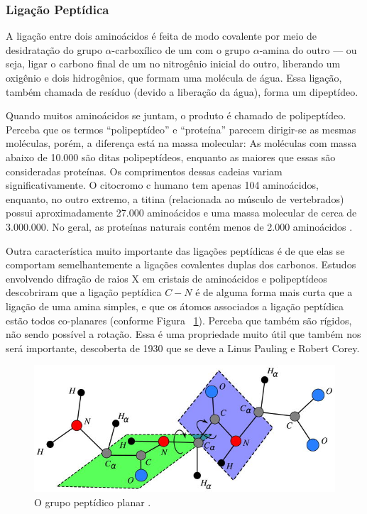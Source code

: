 \documentclass[a4paper,12pt]{article}
\begin{document}
	\subsubsection*{Ligação Peptídica}
	A ligação entre dois aminoácidos é feita de modo covalente por meio de desidratação do grupo $\alpha$-carboxílico de um com o grupo $\alpha$-amina do outro --- ou seja, ligar o carbono final de um no nitrogênio inicial do outro, liberando um oxigênio e dois hidrogênios, que formam uma molécula de água. Essa ligação, também chamada de resíduo (devido a liberação da água), forma um dipeptídeo. 
	
	Quando muitos aminoácidos se juntam, o produto é chamado de polipeptídeo. Perceba que os termos ``polipeptídeo'' e ``proteína'' parecem dirigir-se as mesmas moléculas, porém, a diferença está na massa molecular: As moléculas com massa abaixo de 10.000 são ditas polipeptídeos, enquanto as maiores que essas são consideradas proteínas. Os comprimentos dessas cadeias variam significativamente. O citocromo c humano tem apenas 104 aminoácidos, enquanto, no outro extremo, a titina (relacionada ao músculo de vertebrados) possui aproximadamente 27.000 aminoácidos e uma massa molecular de cerca de 3.000.000. No geral, as proteínas naturais contém menos de 2.000 aminoácidos \cite{bioquimicaLehninger}.
	
	Outra característica muito importante das ligações peptídicas é de que elas se comportam semelhantemente a ligações covalentes duplas dos carbonos. Estudos envolvendo difração de raios X em cristais de aminoácidos e polipeptídeos descobriram que a ligação peptídica $C-N$ é de alguma forma mais curta que a ligação de uma amina simples, e que os átomos associados a ligação peptídica estão todos co-planares (conforme Figura ~\ref{fig:peptidica}). Perceba que também são rígidos, não sendo possível a rotação. Essa é uma propriedade muito útil que também nos será importante, descoberta de 1930 que se deve a Linus Pauling e Robert Corey.
	
	\begin{figure}[H]
		\begin{center}
			\includegraphics[width=0.8\linewidth]{peptide.jpg}
		\end{center}
		\caption{O grupo peptídico planar \cite{carlile:MinimalOrder}.}
		\label{fig:peptidica}
	\end{figure}
\end{document}
